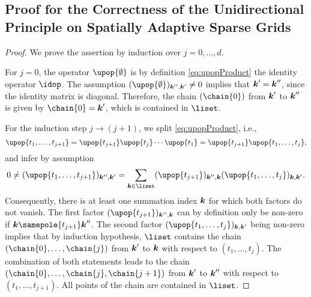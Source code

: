 \disableornamentsfornextheadingtrue
\subsection{%
  Proof for the Correctness of the Unidirectional Principle on
  Spatially Adaptive Sparse Grids%
}
\label{sec:a134proofCorrectnessUnidirectionalPrincipleSASG}

\lemmaChainExistenceSufficient*

\begin{proof}
  We prove the assertion by induction over $j = 0, \dotsc, d$.
  
  For $j = 0$, the operator $\upop{\emptyset}$ is by definition
  \eqref{eq:upopProduct} the identity operator $\idop$.
  The assumption $(\upop{\emptyset})_{\*k'',\*k'} \not= 0$
  implies that ${\boldsymbol{k}}' = {\boldsymbol{k}}''$, since the identity matrix is diagonal.
  Therefore, the chain $(\chain{0})$ from ${\boldsymbol{k}}'$ to ${\boldsymbol{k}}''$ is given by
  $\chain{0} = \*k'$, which is contained in $\liset$.
  
  For the induction step $j \to (j+1)$, we split \cref{eq:upopProduct},
  i.e.,
  \begin{equation}
    \upop{t_1,\dotsc,t_{j+1}}
    = \upop{t_{j+1}} \upop{t_j} \dotsm \upop{t_1}
    = \upop{t_{j+1}} \upop{t_1,\dotsc,t_j},
  \end{equation}
  and infer by assumption
  \begin{equation}
    \label{eq:proofLemmaChainExistenceSufficient1}
    0
    \not= (\upop{t_1,\dotsc,t_{j+1}})_{\*k'',\*k'}
    = \sum_{\*k \in \liset} (\upop{t_{j+1}})_{\*k'',\*k}
    (\upop{t_1,\dotsc,t_j})_{\*k,\*k'}.
  \end{equation}
  Consequently,
  there is at least one summation index ${\boldsymbol{k}}$
  for which both factors do not vanish.
  The first factor $(\upop{t_{j+1}})_{\*k'',\*k}$ can by definition
  only be non-zero if $\*k \samepole{t_{j+1}} \*k''$.
  The second factor $(\upop{t_1,\dotsc,t_j})_{\*k,\*k'}$ being
  non-zero implies that by induction hypothesis,
  $\liset$ contains the chain $(\chain{0}, \dotsc, \chain{j})$
  from ${\boldsymbol{k}}'$ to ${\boldsymbol{k}}$ with respect to $(t_1, \dotsc, t_j)$.
  The combination of both statements leads to
  the chain $(\chain{0}, \dotsc, \chain{j}, \chain{j+1})$ from ${\boldsymbol{k}}'$
  to ${\boldsymbol{k}}''$ with respect to $(t_1, \dotsc, t_{j+1})$.
  All points of the chain are contained in $\liset$.
\end{proof}

\lemmaChainExistenceNecessary*

